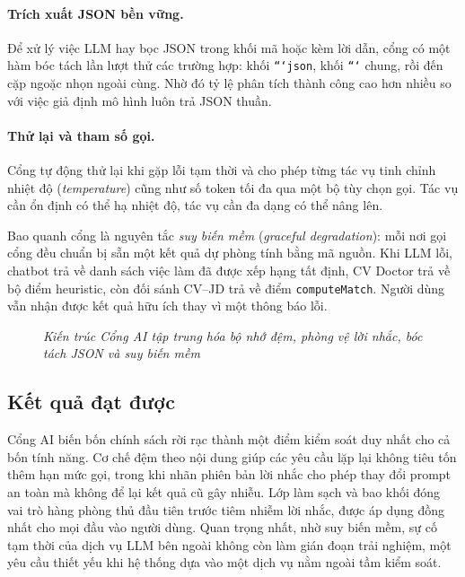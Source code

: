 \documentclass[../DoAn.tex]{subfiles}
\begin{document}
\paragraph{Trích xuất JSON bền vững.} Để xử lý việc LLM hay bọc JSON trong khối mã hoặc kèm lời dẫn, cổng có một hàm bóc tách lần lượt thử các trường hợp: khối \texttt{```json}, khối \texttt{```} chung, rồi đến cặp ngoặc nhọn ngoài cùng. Nhờ đó tỷ lệ phân tích thành công cao hơn nhiều so với việc giả định mô hình luôn trả JSON thuần.

\paragraph{Thử lại và tham số gọi.} Cổng tự động thử lại khi gặp lỗi tạm thời và cho phép từng tác vụ tinh chỉnh nhiệt độ (\textit{temperature}) cũng như số token tối đa qua một bộ tùy chọn gọi. Tác vụ cần ổn định có thể hạ nhiệt độ, tác vụ cần đa dạng có thể nâng lên.

Bao quanh cổng là nguyên tắc \emph{suy biến mềm} (\textit{graceful degradation}): mỗi nơi gọi cổng đều chuẩn bị sẵn một kết quả dự phòng tính bằng mã nguồn. Khi LLM lỗi, chatbot trả về danh sách việc làm đã được xếp hạng tất định, CV Doctor trả về bộ điểm heuristic, còn đối sánh CV--JD trả về điểm \texttt{computeMatch}. Người dùng vẫn nhận được kết quả hữu ích thay vì một thông báo lỗi.

\begin{figure}[ht]
  \centering
  \caption{\textit{Kiến trúc Cổng AI tập trung hóa bộ nhớ đệm, phòng vệ lời nhắc, bóc tách JSON và suy biến mềm}}
  \label{fig:ch5-gateway}
\end{figure}

\subsection{Kết quả đạt được}

Cổng AI biến bốn chính sách rời rạc thành một điểm kiểm soát duy nhất cho cả bốn tính năng. Cơ chế đệm theo nội dung giúp các yêu cầu lặp lại không tiêu tốn thêm hạn mức gọi, trong khi nhãn phiên bản lời nhắc cho phép thay đổi prompt an toàn mà không để lại kết quả cũ gây nhiễu. Lớp làm sạch và bao khối đóng vai trò hàng phòng thủ đầu tiên trước tiêm nhiễm lời nhắc, được áp dụng đồng nhất cho mọi đầu vào người dùng. Quan trọng nhất, nhờ suy biến mềm, sự cố tạm thời của dịch vụ LLM bên ngoài không còn làm gián đoạn trải nghiệm, một yêu cầu thiết yếu khi hệ thống dựa vào một dịch vụ nằm ngoài tầm kiểm soát.
\end{document}
